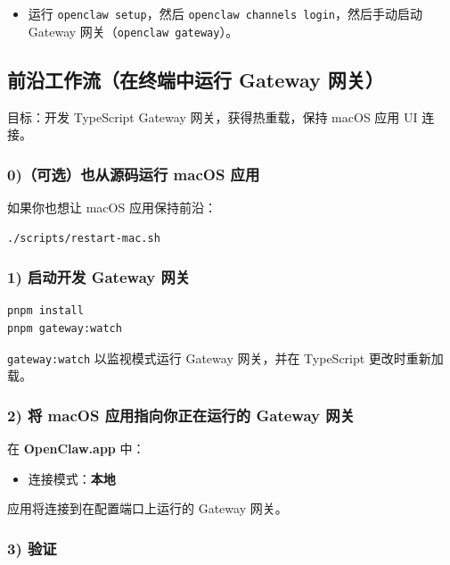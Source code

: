 \begin{itemize}
  \item 运行 \texttt{openclaw setup}，然后 \texttt{openclaw channels login}，然后手动启动 Gateway 网关（\texttt{openclaw gateway}）。
\end{itemize}


\subsection{前沿工作流（在终端中运行 Gateway 网关）}


目标：开发 TypeScript Gateway 网关，获得热重载，保持 macOS 应用 UI 连接。

\subsubsection{0)（可选）也从源码运行 macOS 应用}


如果你也想让 macOS 应用保持前沿：

\begin{lstlisting}[language=bash]
./scripts/restart-mac.sh
\end{lstlisting}


\subsubsection{1) 启动开发 Gateway 网关}


\begin{lstlisting}[language=bash]
pnpm install
pnpm gateway:watch
\end{lstlisting}


\texttt{gateway:watch} 以监视模式运行 Gateway 网关，并在 TypeScript 更改时重新加载。

\subsubsection{2) 将 macOS 应用指向你正在运行的 Gateway 网关}


在 \textbf{OpenClaw.app} 中：

\begin{itemize}
  \item 连接模式：\textbf{本地}
\end{itemize}

应用将连接到在配置端口上运行的 Gateway 网关。

\subsubsection{3) 验证}



